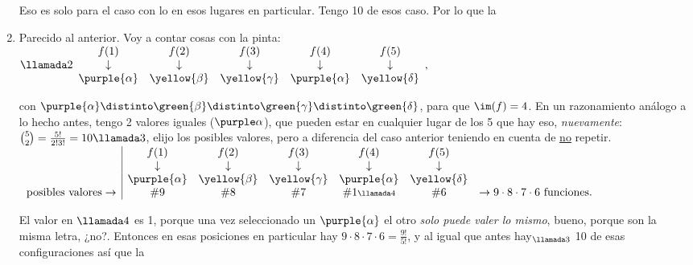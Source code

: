 \begin{enumerate}[label=\alph*)]
        Eso es solo para el caso con lo  en esos lugares en particular. Tengo 10 de esos caso. Por lo que la

  \item Parecido al anterior. Voy a contar cosas con la pinta:
        $\llamada2
          \begin{array}{ccccc}
            f(1)            & f(2)           & f(3)            & f(4)            & f(5)            \\
            \downarrow      & \downarrow     & \downarrow      & \downarrow      & \downarrow      \\
            \purple{\alpha} & \yellow{\beta} & \yellow{\gamma} & \purple{\alpha} & \yellow{\delta}
          \end{array},
        $

        con $\purple{\alpha} \distinto \green{\beta} \distinto\green{\gamma} \distinto \green{\delta}$, para que $\im(f) = 4$.
        En un razonamiento análogo a lo hecho antes, tengo 2 valores iguales ($\purple\alpha$), que pueden estar en cualquier
        lugar de los 5 que hay eso, \textit{nuevamente}: $\binom{5}{2} = \frac{5!}{2!3!} = 10\llamada3$,
        elijo los posibles valores, pero a diferencia del caso anterior teniendo en cuenta de \underline{no} repetir.\\

        $\begin{array}{c|cccccc}
                                       & f(1)            & f(2)           & f(3)            & f(4)                       & f(5)            &                                            \\
                                       & \downarrow      & \downarrow     & \downarrow      & \downarrow                 & \downarrow      &                                            \\
                                       & \purple{\alpha} & \yellow{\beta} & \yellow{\gamma} & \purple{\alpha}            & \yellow{\delta} &                                            \\
            \text{posibles valores}\to & \#9             & \#8            & \#7             & \#1{\scriptstyle\llamada4} & \#6             & \to 9\cdot8\cdot7\cdot6 \text{ funciones}.
          \end{array}
        $

        El valor en $\llamada4$ es 1, porque una vez seleccionado un $\purple{\alpha}$ el otro \textit{solo puede valer lo mismo},
        bueno, porque son la misma letra, ¿no?. Entonces en esas posiciones en particular hay
        $9\cdot8\cdot 7\cdot6 = \frac{9!}{5!}$, y al igual que antes hay$_{\llamada3}$ 10 de esas configuraciones así que la
\end{enumerate}

\begin{aportes}
  \item {}
\end{aportes}

